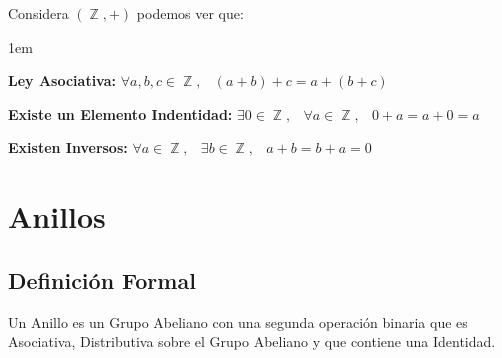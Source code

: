 \documentclass[12pt, fleqn]{report}                             %
\newenvironment{Indentation}[1][0.75em]                         %
        {\begin{adjustwidth}{#1}{}}                                 %
        {\end{adjustwidth}}                                         %
\DeclareMathOperator \Space     {\quad}                         %
\DeclareMathOperator \MiniSpace {\;}                            %
\theoremstyle{break}                                            %
\DeclareMathOperator \Integers     {\mathbb{Z}}                 %
\begin{document}
                Considera $(\Integers, +)$ podemos ver que:
                \begin{Indentation}[1em]
                \begin{itemize}
                \small{
                    
                    \item 
                        \textbf{Ley Asociativa:}
                        $\forall a, b, c \in \Integers, \MiniSpace (a + b) + c = a + (b + c)$

                    \item 
                        \textbf{Existe un Elemento Indentidad:}
                        $\exists 0 \in \Integers, \MiniSpace
                            \forall a \in \Integers, \MiniSpace 0 + a = a + 0 = a$

                    \item 
                        \textbf{Existen Inversos:}
                        $\forall a \in \Integers, \MiniSpace
                                \exists b \in \Integers, \MiniSpace
                                    a + b = b + a = 0$

                }
                \end{itemize}
                \end{Indentation}







        \clearpage
        \section{Anillos}

            \subsection{Definición Formal}

                Un Anillo es un Grupo Abeliano con una segunda operación binaria que es Asociativa, 
                Distributiva sobre el Grupo Abeliano y que contiene una Identidad.
\end{document}
